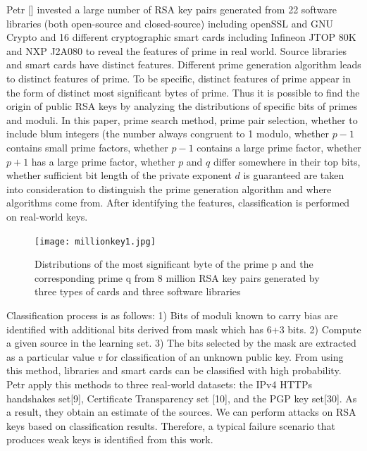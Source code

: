 \documentclass[a4paper]{article}
\begin{document}
Petr [] invested a large number of RSA key pairs generated from 22 software libraries (both open-source and closed-source) including openSSL and GNU Crypto and 16 different cryptographic smart cards including Infineon JTOP 80K and NXP J2A080 to reveal the features of prime in real world. Source libraries and smart cards have distinct features. Different prime generation algorithm leads to distinct features of prime. To be specific, distinct features of prime appear in the form of distinct most significant bytes of prime. Thus it is possible to find the origin of public RSA keys by analyzing the distributions of specific bits of primes and moduli. In this paper, prime search method, prime pair selection, whether to include blum integers (the number always congruent to 1 modulo, whether $p-1$ contains small prime factors, whether $p-1$ contains a large prime factor, whether $p+1$ has a large prime factor, whether $p$ and $q$ differ somewhere in their top bits, whether sufficient bit length of the private exponent $d$ is guaranteed are taken into consideration to distinguish the prime generation algorithm and where algorithms come from. After identifying the features, classification is performed on real-world keys. 

\begin{figure}[t]
   \centering
   \texttt{[image: millionkey1.jpg]}
   \caption{Distributions of the most significant byte of the prime p and the corresponding prime q from 8 million RSA key pairs generated by three types of cards and three software libraries \cite{}}
   \label{fig:IGEDec}
\end{figure} 

Classification process is as follows: 1) Bits of moduli known to carry bias are identified with additional bits derived from mask which has 6+3 bits. 2) Compute a given source in the learning set. 3) The bits selected by the mask are extracted as a particular value $v$ for classification of an unknown public key. From using this method, libraries and smart cards can be classified with high probability. Petr apply this methods to three real-world datasets: the IPv4 HTTPs handshakes set[9], Certificate Transparency set [10], and the PGP key set[30]. As a result, they obtain an estimate of the sources. We can perform attacks on RSA keys based on classification results. Therefore, a typical failure scenario that produces weak keys is identified from this work. 
    
          
    
\end{document}
